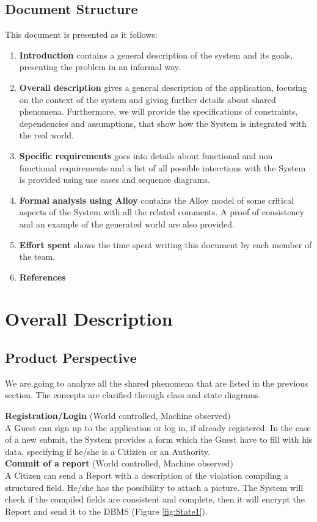 \documentclass{report}
\begin{document}
\section{Document Structure}
This document is presented as it follows:
\begin{enumerate}
	\item {\textbf{Introduction}} contains a general description of the system and its goals, presenting the problem in an informal way.
	\item{\textbf{Overall description}} gives a general description of the application, focusing on the context of the system and giving further details about shared phenomena. Furthermore, we will provide the specifications of constraints, dependencies and assumptions, that show how the System is integrated with the real world.
	\item{\textbf{Specific requirements}} goes into details about functional and non functional requirements and a list of all possible interctions with the System is provided using use cases and sequence diagrams.
	\item {\textbf{Formal analysis using Alloy}} contains the Alloy model of some critical aspects of the System with all the related comments. A proof of consistency and an example of the generated world are also provided.
	\item {\textbf{Effort spent}} shows the time spent writing this document by each member of the team.
	\item {\textbf{References}}
\end{enumerate}

\chapter{Overall Description}
\section{Product Perspective}
We are going to analyze all the shared phenomena that are listed in the previous section. The concepts are clarified through class and state diagrams.\\ \vspace{2mm}

\noindent\textbf{Registration/Login} (World controlled, Machine observed)\\
A Guest can sign up to the application or log in, if already registered. 
In the case of a new submit, the System provides a form which the Guest have to fill with his data, specifying if he/she is 
a Citizien or an Authority.\\ \vspace{2mm}
\noindent\textbf{Commit of a report} (World controlled, Machine observed)\\
A Citizen can send a Report with a description of the violation compiling a structured field. He/she has the possibility to  attach a picture. The System will check if the compiled fields are consistent and complete, then it will encrypt the Report and send it to the DBMS (Figure \ref{fig:State1}). \\ \vspace{2mm}
\end{document}
